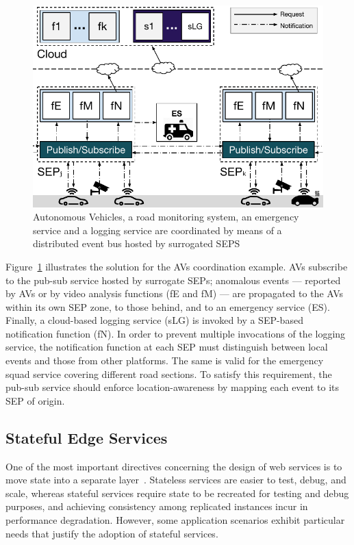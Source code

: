 \begin{figure}[tbp]
	\centering
	\includegraphics[width=1\linewidth]{Figs/Edge_Coordination_AVs_wide.pdf}
	\caption{Autonomous Vehicles, a road monitoring system, an emergency service and a logging service are coordinated by means of a distributed event bus hosted by surrogated SEPS}
	\label{fig:Edge_Coordination_AVs}
\end{figure}

Figure~\ref{fig:Edge_Coordination_AVs} illustrates the solution for the AVs coordination example. AVs subscribe to the pub-sub service hosted by surrogate SEPs; anomalous events --- reported by AVs or by video analysis functions (fE and fM) --- are propagated to the AVs within its own SEP zone, to those behind, and to an emergency service (ES). Finally, a cloud-based logging service (sLG) is invoked by a SEP-based notification function (fN). In order to prevent multiple invocations of the logging service, the notification function at each SEP must distinguish between local events and those from other platforms. The same is valid for the emergency squad service covering different road sections. To satisfy this requirement, the pub-sub service should enforce location-awareness by mapping each event to its SEP of origin.

\subsection{Stateful Edge Services}

One of the most important directives concerning the design of web services is to move state into a separate layer~\cite{Armbrust:2010}. Stateless services are easier to test, debug, and scale, whereas stateful services require state to be recreated for testing and debug purposes, and achieving consistency among replicated instances incur in performance degradation. However, some application scenarios exhibit particular needs that justify the adoption of stateful services.


